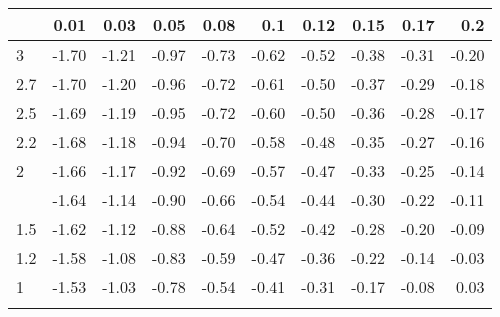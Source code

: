 
\begin{tabular}{lrrrrrrrrr}
\toprule{}
  & 0.01 & 0.03 & 0.05 & 0.08 & 0.1 & 0.12 & 0.15 & 0.17 & 0.2\\
\midrule{}
3 & -1.70 & -1.21 & -0.97 & -0.73 & -0.62 & -0.52 & -0.38 & -0.31 & -0.20\\
2.7 & -1.70 & -1.20 & -0.96 & -0.72 & -0.61 & -0.50 & -0.37 & -0.29 & -0.18\\
2.5 & -1.69 & -1.19 & -0.95 & -0.72 & -0.60 & -0.50 & -0.36 & -0.28 & -0.17\\
2.2 & -1.68 & -1.18 & -0.94 & -0.70 & -0.58 & -0.48 & -0.35 & -0.27 & -0.16\\
2 & -1.66 & -1.17 & -0.92 & -0.69 & -0.57 & -0.47 & -0.33 & -0.25 & -0.14\\
\addlinespace
1.7 & -1.64 & -1.14 & -0.90 & -0.66 & -0.54 & -0.44 & -0.30 & -0.22 & -0.11\\
1.5 & -1.62 & -1.12 & -0.88 & -0.64 & -0.52 & -0.42 & -0.28 & -0.20 & -0.09\\
1.2 & -1.58 & -1.08 & -0.83 & -0.59 & -0.47 & -0.36 & -0.22 & -0.14 & -0.03\\
1 & -1.53 & -1.03 & -0.78 & -0.54 & -0.41 & -0.31 & -0.17 & -0.08 & 0.03\\
\bottomrule{}
\end{tabular}
